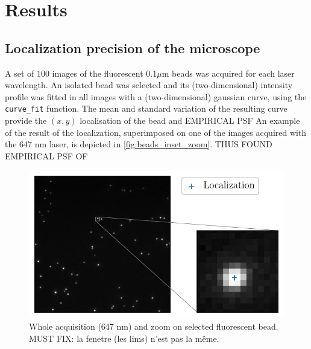 \section{Results}
\subsection{Localization precision of the microscope}
A set of 100 images of the fluorescent $0.1 \mu$m beads was acquired for each laser wavelength.
An isolated bead was selected and its (two-dimensional) intensity profile was fitted in all images with a (two-dimensional) gaussian curve, using the \verb|curve_fit|  function. 
The mean and standard variation of the resulting curve provide the $(x,y)$ localisation of the bead and EMPIRICAL PSF
An example of the result of the localization, superimposed on one of the images acquired with the 647 nm laser, is depicted in \autoref{fig:beads_inset_zoom}. 
THUS FOUND EMPIRICAL PSF OF

\begin{figure}[htbp]
    \centering
    \includegraphics[scale=1]{figures/beads_inset_zoom.pdf}
    \caption{Whole acquisition (647 nm) and zoom on selected fluorescent bead. MUST FIX: la fenetre (les lims) n'est pas la même.}
    \label{fig:beads_inset_zoom}
\end{figure}



